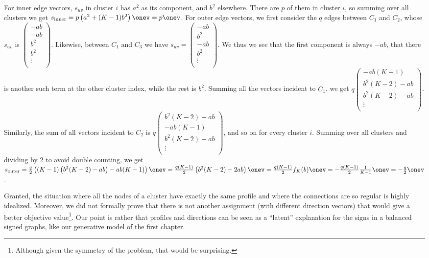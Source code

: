 \begin{aside}
For inner edge vectors, $s_{uv}$ in cluster $i$ has $a^2$ as its \ith{} component, and $b^2$
elsewhere. There are $p$ of them in cluster $i$, so summing over all clusters we get
$s_{\mathrm{inner}} = p\left(a^2 + (K-1)b^2\right)\onev = p\onev$.
For outer edge vectors, we first consider the $q$ edges between $C_1$ and $C_2$,
whose $s_{uv}$ is
$\begin{pmatrix}
  -ab \\
  -ab \\
  b^2 \\
  b^2 \\
  \vdots \\  
\end{pmatrix}$. Likewise, between $C_1$ and $C_3$ we have
$s_{uv}=\begin{pmatrix}
  -ab \\
  b^2 \\
  -ab \\
  b^2 \\
  \vdots \\  
\end{pmatrix}$. We thus we see that the first component is always $-ab$, that there is another
such term at the other cluster index, while the rest is $b^2$. Summing all the vectors incident to
$C_1$, we get
$q\begin{pmatrix}
  -ab(K-1) \\
  b^2(K-2) -ab \\
  b^2(K-2) -ab \\
  \vdots \\  
\end{pmatrix}$. Similarly, the sum of all vectors incident to $C_2$ is
$q\begin{pmatrix}
  b^2(K-2) -ab \\
  -ab(K-1) \\
  b^2(K-2) -ab \\
  \vdots \\  
\end{pmatrix}$, and so on for every cluster $i$. Summing over all clusters and dividing by $2$ to
avoid double counting, we get $s_{\mathrm{outer}} = \frac{q}{2}\left( (K-1)\left(b^2(K-2) -ab\right)
-ab(K-1) \right)\onev = \frac{q(K-1)}{2}\left(b^2(K-2) -2ab\right)\onev =
\frac{q(K-1)}{2}f_K(b)\onev = -\frac{q(K-1)}{2} \frac{1}{K-1} \onev = -\frac{q}{2}\onev$.
\end{aside}

Granted, the situation where all the nodes of a cluster have exactly the same profile and where the
connections are so regular is highly idealized. Moreover, we did not formally prove that there is
not another assignment (with different direction vectors) that would give a better objective
value\footnote{Although given the symmetry of the problem, that would be surprising.}. Our point is
rather that profiles and directions can be seen as a \enquote{latent} explanation for the signs in
a balanced signed graphs, like our generative model of the first chapter.

